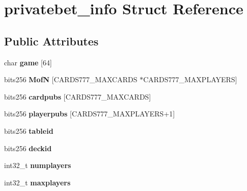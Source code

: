 \hypertarget{structprivatebet__info}{}\section{privatebet\+\_\+info Struct Reference}
\label{structprivatebet__info}
\subsection*{Public Attributes}
\begin{DoxyCompactItemize}
\item 
\mbox{\label{structprivatebet__info_a9f134d6dc6e24c2382cc9a937a8c4fd9}} 
char {\bfseries game} \mbox{[}64\mbox{]}
\item 
\mbox{\label{structprivatebet__info_ac33fc414297eac35e0e50eefcce9e358}} 
bits256 {\bfseries MofN} \mbox{[}C\+A\+R\+D\+S777\+\_\+\+M\+A\+X\+C\+A\+R\+DS $\ast$C\+A\+R\+D\+S777\+\_\+\+M\+A\+X\+P\+L\+A\+Y\+E\+RS\mbox{]}
\item 
\mbox{\label{structprivatebet__info_a8f79ab33689ddb0e10858491ec02a896}} 
bits256 {\bfseries cardpubs} \mbox{[}C\+A\+R\+D\+S777\+\_\+\+M\+A\+X\+C\+A\+R\+DS\mbox{]}
\item 
\mbox{\label{structprivatebet__info_ad834b583e3a2f3b8607420c42751e376}} 
bits256 {\bfseries playerpubs} \mbox{[}C\+A\+R\+D\+S777\+\_\+\+M\+A\+X\+P\+L\+A\+Y\+E\+RS+1\mbox{]}
\item 
\mbox{\label{structprivatebet__info_a2092f6f498aad90aa677505b82e48c9e}} 
bits256 {\bfseries tableid}
\item 
\mbox{\label{structprivatebet__info_ac742825adc9a2808a8e0d18390e18b24}} 
bits256 {\bfseries deckid}
\item 
\mbox{\label{structprivatebet__info_a8a60dda249031fc496a0307c34f3cb69}} 
int32\+\_\+t {\bfseries numplayers}
\item 
\mbox{\label{structprivatebet__info_a2d44b99e9160029507e6e0d04b92dbd4}} 
int32\+\_\+t {\bfseries maxplayers}

\end{DoxyCompactItemize}
